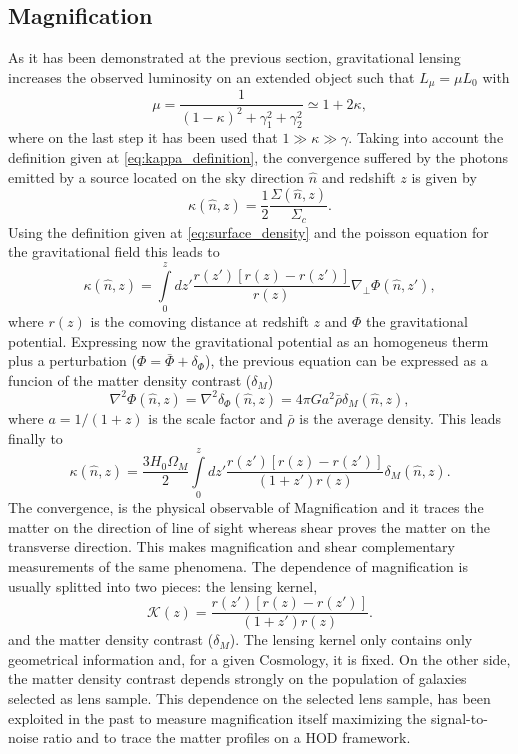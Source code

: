 \subsection{Magnification}
As it has been demonstrated at the previous section, gravitational lensing increases the observed luminosity on an extended object \cite{1989Sci...245..824B,1992RvMA....5..259B,1992LNP...406..345B,1995A&A...303..643B,1995AIPC..336..307B} such that $L_\mu = \mu L_0$ with 
\begin{equation}
\mu = \frac1{(1-\kappa)^2+\gamma_1^2+\gamma_2^2}\simeq 1+2\kappa,
\label{eq:mu_definition}
\end{equation}
where on the last step it has been used that $1\gg\kappa\gg\gamma$. Taking into account the definition given at \autoref{eq:kappa_definition}, the convergence suffered by the photons emitted by a source located on the sky direction $\hat n$ and redshift $z$ is given by
\begin{equation}
\kappa(\hat n,z) = \frac{1}{2}\frac{\Sigma(\hat n,z)}{\Sigma_c}.
\end{equation}
Using the definition given at \autoref{eq:surface_density} and the poisson equation for the gravitational field this leads to
\begin{equation}
\kappa(\hat n,z) = \int\limits_0^zdz'\frac{r(z')[r(z)-r(z')]}{r(z)}\nabla_\perp\Phi(\hat n,z'),
\end{equation}
where $r(z)$ is the comoving distance at redshift $z$ and $\Phi$ the gravitational potential. Expressing now the gravitational potential as an homogeneus therm plus a perturbation ($\Phi = \bar\Phi+\delta_\Phi$), the previous equation can be expressed as a funcion of the matter density contrast ($\delta_M$)
\begin{equation}
\nabla^2\Phi(\hat n,z) = \nabla^2\delta_\Phi(\hat n,z) = 4\pi Ga^2\bar\rho\delta_M(\hat n,z),
\end{equation}
where $a=1/(1+z)$ is the scale factor and $\bar\rho$ is the average density. This leads finally to
\begin{equation}
\kappa(\hat n,z) = \frac{3H_0\Omega_M}{2}\int\limits_0^zdz'\frac{r(z')[r(z)-r(z')]}{(1+z')r(z)}\delta_M(\hat n,z).
\label{eq:kappadeltam}
\end{equation}
The convergence, is the physical observable of Magnification and it traces the matter on the direction of line of sight whereas shear proves the matter on the transverse direction. This makes magnification and shear complementary measurements of the same phenomena. The dependence of magnification is usually splitted into two pieces: the lensing kernel,
\begin{equation}
\mathcal{K}(z) = \frac{r(z')[r(z)-r(z')]}{(1+z')r(z)}.
\end{equation}
and the matter density contrast ($\delta_M$). The lensing kernel only contains only geometrical information and, for a given Cosmology, it is fixed. On the other side, the matter density contrast depends strongly on the population of galaxies selected as lens sample. This dependence on the selected lens sample, has been exploited in the past to measure magnification itself maximizing the signal-to-noise ratio and to trace the matter profiles on a HOD framework.
\newline

